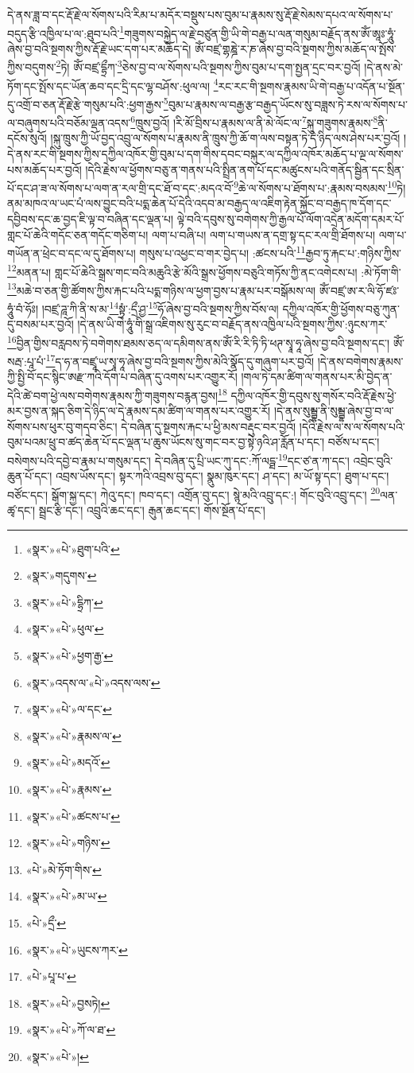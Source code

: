 དེ་ནས་ཟླ་བ་དང་རྡོ་རྗེ་ལ་སོགས་པའི་རིམ་པ་མདོར་བསྡུས་པས་བུམ་པ་རྣམས་སུ་རྡོ་རྗེ་སེམས་དཔའ་ལ་སོགས་པ་བདུད་རྩི་འཁྱིལ་པ་ལ་:ཐུབ་པའི་\footnote{«སྣར་»«པེ་»ཐུག་པའི་}གཟུགས་བསྐྱེད་ལ་རྗེ་བཙུན་གྱི་ཡི་གེ་བརྒྱ་པ་ལན་གསུམ་བརྗོད་ནས་ཨོཾ་ཨཱཿ་ཧཱུཾ་ཞེས་བྱ་བའི་སྔགས་ཀྱིས་རྡོ་རྗེ་ཡང་དག་པར་མཆོད་དེ། ཨོཾ་བཛྲ་གྷཎྜེ་ར་ཎ་ཞེས་བྱ་བའི་སྔགས་ཀྱིས་མཆོད་ལ་སྤོས་ཀྱིས་བདུགས་\footnote{«སྣར་»གདུགས་}ཏེ། ཨོཾ་བཛྲ་དྷྲྀཀ་\footnote{«སྣར་»«པེ་»དྷྲིཀ་}ཅེས་བྱ་བ་ལ་སོགས་པའི་སྔགས་ཀྱིས་བུམ་པ་དག་སྤྱན་དྲང་བར་བྱའོ། །དེ་ནས་མེ་ཏོག་དང་སྤོས་དང་ཡོན་ཆབ་དང་དྲི་དང་ལྷ་བཤོས་:ཕུལ་ལ། \footnote{«སྣར་»«པེ་»ཕུལ་}རང་རང་གི་སྔགས་རྣམས་ཡི་གེ་བརྒྱ་པ་འདོན་པ་སྔོན་དུ་འགྲོ་བ་ཅན་རྡོ་རྗེ་རྩེ་གསུམ་པའི་:ཕྱག་རྒྱས་\footnote{«སྣར་»«པེ་»ཕྱག་རྒྱ་}བུམ་པ་རྣམས་ལ་བརྒྱ་རྩ་བརྒྱད་ཡོངས་སུ་བཟླས་ཏེ་རས་ལ་སོགས་པ་ལ་བཞུགས་པའི་བཅོམ་ལྡན་འདས་\footnote{«སྣར་»འདས་ལ་«པེ་»འདས་ལས་}ཁྲུས་བྱའོ། །རི་མོ་བྲིས་པ་རྣམས་ལ་ནི་མེ་ལོང་ལ་\footnote{«སྣར་»«པེ་»ལ་དང་}སྐུ་གཟུགས་རྣམས་\footnote{«སྣར་»«པེ་»རྣམས་ལ་}ནི་དངོས་སུའོ། །སྐུ་ཁྲུས་ཀྱི་ཡོ་བྱད་འབྲུ་ལ་སོགས་པ་རྣམས་ནི་ཁྲུས་ཀྱི་ཆོ་ག་ལས་བསྟན་ཏེ་དེ་ཉིད་ལས་ཤེས་པར་བྱའོ། །དེ་ནས་རང་གི་སྔགས་ཀྱིས་དཀྱིལ་འཁོར་གྱི་བུམ་པ་དག་གིས་དབང་བསྐུར་ལ་དཀྱིལ་འཁོར་མཆོད་པ་ལྔ་ལ་སོགས་པས་མཆོད་པར་བྱའོ། །དེའི་རྗེས་ལ་ཕྱོགས་བཅུ་ན་གནས་པའི་སྤྲིན་ནག་པོ་དང་མཚུངས་པའི་གནོད་སྦྱིན་དང་སྲིན་པོ་དང་ཤ་ཟ་ལ་སོགས་པ་ལག་ན་རལ་གྲི་དང་ཐོ་བ་དང་:མདའ་བོ་\footnote{«སྣར་»«པེ་»མདའོ་}ཆེ་ལ་སོགས་པ་ཐོགས་པ་:རྣམས་བསམས་\footnote{«སྣར་»«པེ་»རྣམས་}ཏེ། ནམ་མཁའ་ལ་ཡང་པཾ་ལས་བྱུང་བའི་པདྨ་ཆེན་པོ་དེའི་འདབ་མ་བརྒྱད་ལ་འཇིག་རྟེན་སྐྱོང་བ་བརྒྱད་ཁ་དོག་དང་དབྱིབས་དང་ཆ་བྱད་ཇི་ལྟ་བ་བཞིན་དང་ལྡན་པ། ལྟེ་བའི་དབུས་སུ་བགེགས་ཀྱི་རྒྱལ་པོ་ལོག་འདྲེན་མདོག་དམར་པོ་གླང་པོ་ཆེའི་གདོང་ཅན་གདོང་གཅིག་པ། ལག་པ་བཞི་པ། ལག་པ་གཡས་ན་དགྲ་སྟ་དང་རལ་གྲི་ཐོགས་པ། ལག་པ་གཡོན་ན་ཕྲེང་བ་དང་ལ་དུ་ཐོགས་པ། གསུས་པ་འཕྱང་བ་གར་བྱེད་པ། :ཚངས་པའི་\footnote{«སྣར་»«པེ་»ཚངས་པ་}རྒྱབ་ཏུ་རྐང་པ་:གཉིས་ཀྱིས་\footnote{«སྣར་»«པེ་»གཉིས་}མནན་པ། གླང་པོ་ཆེའི་སྒྲས་གང་བའི་མཆུའི་རྩེ་མོའི་སྒྲས་ཕྱོགས་བཅུའི་གཏོས་ཀྱི་ནང་འགེངས་པ། :མེ་ཏོག་གི་\footnote{«པེ་»མེ་ཏོག་གིས་}མཆེ་བ་ཅན་གྱི་ཚོགས་ཀྱིས་རྐང་པའི་པདྨ་གཉིས་ལ་ཕྱག་བྱས་པ་རྣམ་པར་བསྒོམས་ལ། ཨོཾ་བཛྲ་ཨ་ར་ལི་ཧོ་ཛཿ་ཧཱུཾ་བཾ་ཧོཿ། །བཛྲ་ཌཱ་ཀི་ནི་ས་མ་\footnote{«སྣར་»«པེ་»མ་ཡ་}སྟྭཾ་:དྲྀ་ཤྱ་\footnote{«པེ་»དྲྀ་}ཧོ་ཞེས་བྱ་བའི་སྔགས་ཀྱིས་བོས་ལ། དཀྱིལ་འཁོར་གྱི་ཕྱོགས་བཅུ་ཀུན་དུ་བསམ་པར་བྱའོ། །དེ་ནས་ཡི་གེ་ཧཱུཾ་གི་སྒྲ་འཇིགས་སུ་རུང་བ་བརྗོད་ནས་འཁྱིལ་པའི་སྔགས་ཀྱིས་:ཉུངས་ཀར་\footnote{«སྣར་»«པེ་»ཡུངས་ཀར་}བྱིན་གྱིས་བརླབས་ཏེ་བགེགས་ཐམས་ཅད་ལ་དམིགས་ནས་ཨོཾ་རི་རི་ཏི་ཏི་ཕཊ་སྭཱ་ཧཱ་ཞེས་བྱ་བའི་སྔགས་དང་། ཨོཾ་སརྦ་:པཱ་པཾ་\footnote{«པེ་»པཱ་པ་}ད་ཧ་ན་བཛྲཱ་ཡ་སྭཱ་ཧཱ་ཞེས་བྱ་བའི་སྔགས་ཀྱིས་མེའི་སྣོད་དུ་གཞུག་པར་བྱའོ། །དེ་ནས་བགེགས་རྣམས་ཀྱི་སྤྱི་བོ་དང་སྙིང་ཨརྫ་ཀའི་དོག་པ་བཞིན་དུ་འགས་པར་འགྱུར་རོ། །གལ་ཏེ་དམ་ཚིག་ལ་གནས་པར་མི་བྱེད་ན་དེའི་ཚེ་བག་ཕྱེ་ལས་བགེགས་རྣམས་ཀྱི་གཟུགས་བརྙན་བྱས།\footnote{«སྣར་»«པེ་»བྱསཏེ།} དཀྱིལ་འཁོར་གྱི་དབུས་སུ་གསོར་བའི་རྡོ་རྗེས་ཕྱེ་མར་བྱས་ན་སྐད་ཅིག་དེ་ཉིད་ལ་དེ་རྣམས་དམ་ཚིག་ལ་གནས་པར་འགྱུར་རོ། །དེ་ནས་སུམྦྷ་ནི་སུམྦྷ་ཞེས་བྱ་བ་ལ་སོགས་པས་ཕུར་བུ་གདབ་ཅིང་། དེ་བཞིན་དུ་སྔགས་རྐང་པ་ཕྱི་མས་བརྡུང་བར་བྱའོ། །དེའི་རྗེས་ལ་ས་ལ་སོགས་པའི་བུམ་པའམ་ཕྲུ་བ་ཚད་ཆེན་པོ་དང་ལྡན་པ་ཆུས་ཡོངས་སུ་གང་བར་བྱ་སྟེ་ཉའི་ཤ་རློན་པ་དང་། བཙོས་པ་དང་། བསེགས་པའི་དབྱེ་བ་རྣམ་པ་གསུམ་དང་། དེ་བཞིན་དུ་པྲི་ཡང་ཀུ་དང་:ཀོ་ལདྠ་\footnote{«སྣར་»«པེ་»ཀོ་ལ་ཐ་}དང་ཙ་ན་ཀ་དང་། འབྲེང་བུའི་ཆུན་པོ་དང་། འབྲས་ཡོས་དང་། སྟར་ཀའི་འབྲས་བུ་དང་། སྣུམ་ཁུར་དང་། ཤ་དང་། མ་ཡོ་སྟ་དང་། ཐུག་པ་དང་། བཙོང་དང་། སྒོག་སྐྱ་དང་། ཀེའུ་དང་། ཁབ་དང་། འགྲོན་བུ་དང་། སྙེ་མའི་འབྲུ་དང་:། གོང་བུའི་འབྲུ་དང་། \footnote{«སྣར་»«པེ་»།  }ལན་ཚྭ་དང་། སྦྲང་རྩི་དང་། འབྲུའི་ཆང་དང་། རྒུན་ཆང་དང་། གོས་སྔོན་པོ་དང་། 